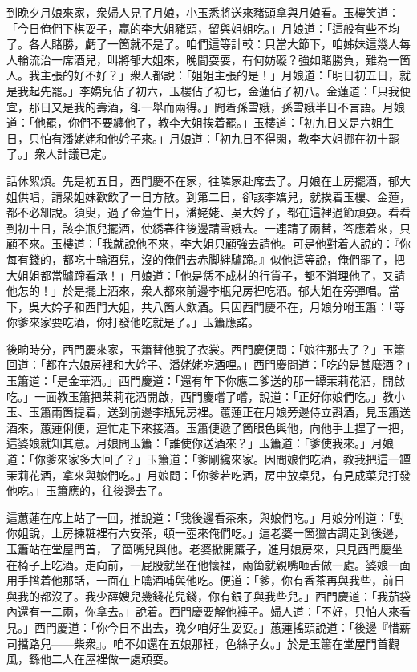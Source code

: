 到晚夕月娘來家，衆婦人見了月娘，小玉悉將送來豬頭拿與月娘看。玉樓笑道：「今日俺們下棋耍子，贏的李大姐豬頭，留與姐姐吃。」月娘道：「這般有些不均了。各人賭勝，虧了一箇就不是了。咱們這等計較：只當大節下，咱姊妹這幾人每人輪流治一席酒兒，叫將郁大姐來，晚間耍耍，有何妨礙？強如賭勝負，難為一箇人。我主張的好不好？」衆人都說：「姐姐主張的是！」月娘道：「明日初五日，就是我起先罷。」李嬌兒佔了初六，玉樓佔了初七，金蓮佔了初八。金蓮道：「只我便宜，那日又是我的壽酒，卻一舉而兩得。」問着孫雪娥，孫雪娥半日不言語。{}月娘道：「他罷，你們不要纏他了，教李大姐挨着罷。」玉樓道：「初九日又是六姐生日，只怕有潘姥姥和他妗子來。」月娘道：「初九日不得閑，教李大姐挪在初十罷了。」衆人計議已定。

話休絮煩。先是初五日，西門慶不在家，往隣家赴席去了。月娘在上房擺酒，郁大姐供唱，請衆姐妹歡飲了一日方散。到第二日，卻該李嬌兒，就挨着玉樓、金蓮，都不必細說。須臾，過了金蓮生日，潘姥姥、吳大妗子，都在這裡過節頑耍。看看到初十日，該李瓶兒擺酒，使綉春往後邊請雪娥去。一連請了兩替，答應着來，只顧不來。{}玉樓道：「我就說他不來，李大姐只顧強去請他。可是他對着人說的：『你每有錢的，都吃十輪酒兒，沒的俺們去赤脚絆驢蹄。』似他這等說，俺們罷了，把大姐姐都當驢蹄看承！」{}月娘道：「他是恁不成材的行貨子，都不消理他了，又請他怎的！」於是擺上酒來，衆人都來前邊李瓶兒房裡吃酒。郁大姐在旁彈唱。當下，吳大妗子和西門大姐，共八箇人飲酒。只因西門慶不在，月娘分咐玉簫：「等你爹來家要吃酒，你打發他吃就是了。」玉簫應諾。

後晌時分，西門慶來家，玉簫替他脫了衣裳。西門慶便問：「娘往那去了？」玉簫回道：「都在六娘房裡和大妗子、潘姥姥吃酒哩。」西門慶問道：「吃的是甚麼酒？」玉簫道：「是金華酒。」西門慶道：「還有年下你應二爹送的那一罈茉莉花酒，開啟吃。」一面教玉簫把茉莉花酒開啟，西門慶嚐了嚐，說道：「正好你娘們吃。」教小玉、玉簫兩箇提着，送到前邊李瓶兒房裡。蕙蓮正在月娘旁邊侍立斟酒，見玉簫送酒來，蕙蓮俐便，連忙走下來接酒。玉簫便遞了箇眼色與他，向他手上捏了一把，{}這婆娘就知其意。月娘問玉簫：「誰使你送酒來？」玉簫道：「爹使我來。」月娘道：「你爹來家多大回了？」玉簫道：「爹剛纔來家。因問娘們吃酒，教我把這一罈茉莉花酒，拿來與娘們吃。」月娘問：「你爹若吃酒，房中放桌兒，有見成菜兒打發他吃。」玉簫應的，往後邊去了。

這蕙蓮在席上站了一回，推說道：「我後邊看茶來，與娘們吃。」月娘分咐道：「對你姐說，上房揀粧裡有六安茶，頓一壺來俺們吃。」這老婆一箇獵古調走到後邊，玉簫站在堂屋門首，𢫓了箇嘴兒與他。老婆掀開簾子，進月娘房來，只見西門慶坐在椅子上吃酒。走向前，一屁股就坐在他懷裡，{}兩箇就親嘴咂舌做一處。婆娘一面用手揝着他那話，一面在上噙酒哺與他吃。便道：「爹，你有香茶再與我些，前日與我的都沒了。我少薛嫂兒幾錢花兒錢，你有銀子與我些兒。」{}西門慶道：「我茄袋內還有一二兩，你拿去。」說着。西門慶要解他褲子。婦人道：「不好，只怕人來看見。」西門慶道：「你今日不出去，晚夕咱好生耍耍。」蕙蓮搖頭說道：「後邊『惜薪司擋路兒——柴衆』。咱不如還在五娘那裡，色絲子女。」於是玉簫在堂屋門首觀風，繇他二人在屋裡做一處頑耍。

